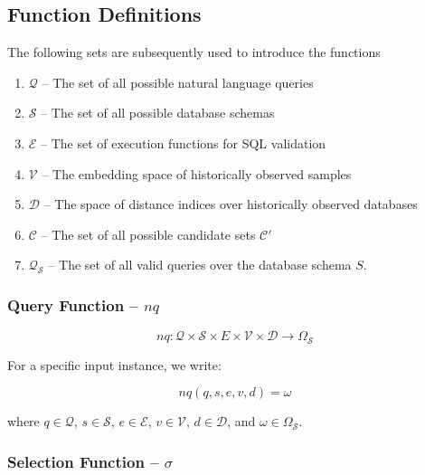 \subsection{Function Definitions}\label{design:function-definitions}

The following sets are subsequently used to introduce the functions

\begin{enumerate}
    \item $\mathcal{Q}$ – The set of all possible natural language queries
    \item $\mathcal{S}$ – The set of all possible database schemas
    \item $\mathcal{E}$ – The set of execution functions for SQL validation
    \item $\mathcal{V}$ – The embedding space of historically observed samples
    \item $\mathcal{D}$ – The space of distance indices over historically observed databases
    \item $\mathcal{C}$ – The set of all possible candidate sets $\mathcal{C}'$
    \item $\mathcal{Q}_{\mathcal{S}}$ – The set of all valid queries over the database schema $S$.
\end{enumerate}

\subsubsection{Query Function – $nq$}

\vspace{0.5em}

$$
nq: \mathcal{Q} \times \mathcal{S} \times E \times \mathcal{V} \times \mathcal{D} \rightarrow \Omega_{\mathcal{S}}
$$

\vspace{0.5em}

For a specific input instance, we write:

$$
nq(q, s, e, v, d) = \omega
$$

\vspace{0.5em}

where $q \in \mathcal{Q}$, $s \in \mathcal{S}$, $e \in \mathcal{E}$, $v \in \mathcal{V}$, $d \in \mathcal{D}$, and $\omega \in \Omega_{\mathcal{S}}$.

\subsubsection{Selection Function – $\sigma$}\label{design:selection-function}

